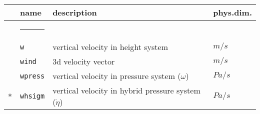 \begin{tabular}{l l l l}  
& \parbox{.15\textwidth}{name} & \parbox{.65\textwidth}{description} & 
\parbox{.1\textwidth}{phys.dim.} \\ \hline  
& \rule{4ex}{0pt} & \\[-10pt]  
  & \texttt{w}	& vertical velocity in height system & $m/s$ \\
 & \texttt{wind}   & 3d velocity vector & $m/s$ \\ 
 & \texttt{wpress}   & vertical velocity in pressure system ($\omega$) 
 & $Pa/s$ \\
* & \texttt{whsigm}   & vertical velocity in hybrid pressure system 
($\dot{\eta}$) & $Pa/s$ \\
\end{tabular}  
